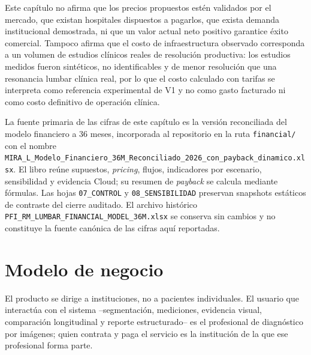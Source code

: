 Este capítulo no afirma que los precios propuestos estén validados por el mercado, que existan hospitales dispuestos a pagarlos, que exista demanda institucional demostrada, ni que un valor actual neto positivo garantice éxito comercial. Tampoco afirma que el costo de infraestructura observado corresponda a un volumen de estudios clínicos reales de resolución productiva: los estudios medidos fueron sintéticos, no identificables y de menor resolución que una resonancia lumbar clínica real, por lo que el costo calculado con tarifas se interpreta como referencia experimental de V1 y no como gasto facturado ni como costo definitivo de operación clínica.

La fuente primaria de las cifras de este capítulo es la versión reconciliada del modelo financiero a 36 meses, incorporada al repositorio en la ruta \texttt{financial/} con el nombre \texttt{MIRA\_L\_Modelo\_Financiero\_36M\_Reconciliado\_2026\_con\_payback\_dinamico.xlsx}. El libro reúne supuestos, \textit{pricing}, flujos, indicadores por escenario, sensibilidad y evidencia Cloud; su resumen de \textit{payback} se calcula mediante fórmulas. Las hojas \texttt{07\_CONTROL} y \texttt{08\_SENSIBILIDAD} preservan snapshots estáticos de contraste del cierre auditado. El archivo histórico \texttt{PFI\_RM\_LUMBAR\_FINANCIAL\_MODEL\_36M.xlsx} se conserva sin cambios y no constituye la fuente canónica de las cifras aquí reportadas.

\section{Modelo de negocio}
\label{sec:mn-modelo}

El producto se dirige a instituciones, no a pacientes individuales. El usuario que interactúa con el sistema --segmentación, mediciones, evidencia visual, comparación longitudinal y reporte estructurado-- es el profesional de diagnóstico por imágenes; quien contrata y paga el servicio es la institución de la que ese profesional forma parte.

